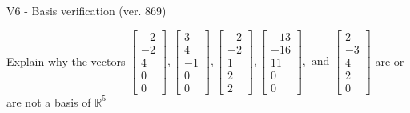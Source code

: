 \begin{exercise}
  \begin{exerciseTitle}V6 - Basis verification (ver. 869)\end{exerciseTitle}
  \begin{exerciseStatement}
    Explain why the vectors \(\left[\begin{array}{r}
-2 \\
-2 \\
4 \\
0 \\
0
\end{array}\right] , \left[\begin{array}{r}
3 \\
4 \\
-1 \\
0 \\
0
\end{array}\right] , \left[\begin{array}{r}
-2 \\
-2 \\
1 \\
2 \\
2
\end{array}\right] , \left[\begin{array}{r}
-13 \\
-16 \\
11 \\
0 \\
0
\end{array}\right] , \text{ and } \left[\begin{array}{r}
2 \\
-3 \\
4 \\
2 \\
0
\end{array}\right]\) are or are not a basis of \(\mathbb{R}^5\)	



\end{exerciseStatement}
\end{exercise}
